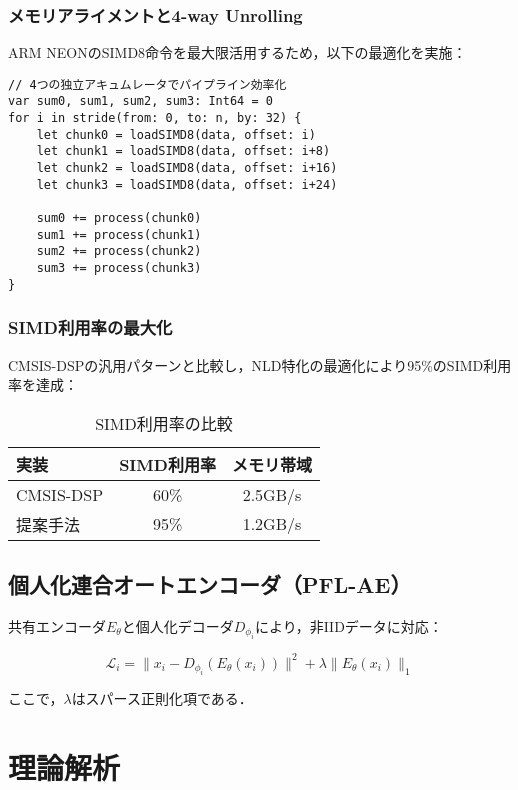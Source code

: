 \documentclass[paper]{ieice}
\begin{document}
\subsubsection{メモリアライメントと4-way Unrolling}
ARM NEONのSIMD8命令を最大限活用するため，以下の最適化を実施：

\begin{lstlisting}[caption=4-way unrollingによるILP向上]
// 4つの独立アキュムレータでパイプライン効率化
var sum0, sum1, sum2, sum3: Int64 = 0
for i in stride(from: 0, to: n, by: 32) {
    let chunk0 = loadSIMD8(data, offset: i)
    let chunk1 = loadSIMD8(data, offset: i+8)
    let chunk2 = loadSIMD8(data, offset: i+16)
    let chunk3 = loadSIMD8(data, offset: i+24)
    
    sum0 += process(chunk0)
    sum1 += process(chunk1)
    sum2 += process(chunk2)
    sum3 += process(chunk3)
}
\end{lstlisting}

\subsubsection{SIMD利用率の最大化}
CMSIS-DSPの汎用パターンと比較し，NLD特化の最適化により95\%のSIMD利用率を達成：

\begin{table}[t]
\caption{SIMD利用率の比較}
\label{tab:simd_util}
\centering
\begin{tabular}{lcc}
\toprule
実装 & SIMD利用率 & メモリ帯域 \\
\midrule
CMSIS-DSP & 60\% & 2.5GB/s \\
提案手法 & 95\% & 1.2GB/s \\
\bottomrule
\end{tabular}
\end{table}

\subsection{個人化連合オートエンコーダ（PFL-AE）}

共有エンコーダ$E_{\theta}$と個人化デコーダ$D_{\phi_i}$により，非IIDデータに対応：

\begin{equation}
\mathcal{L}_i = \|x_i - D_{\phi_i}(E_{\theta}(x_i))\|^2 + \lambda\|E_{\theta}(x_i)\|_1
\end{equation}

ここで，$\lambda$はスパース正則化項である．

\section{理論解析}
\end{document}
